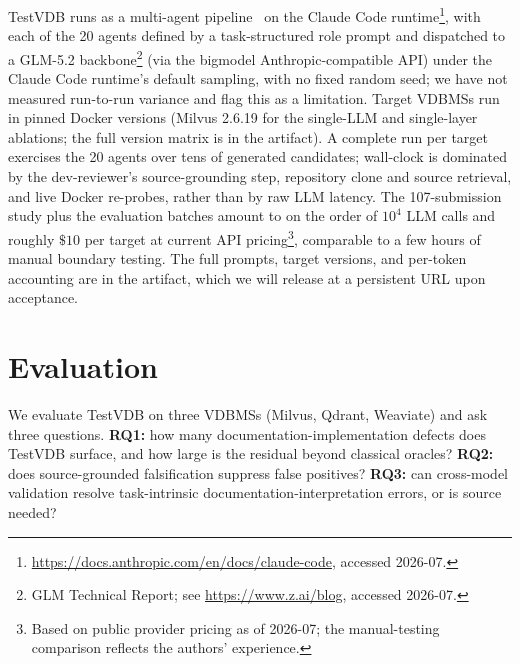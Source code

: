 \documentclass[sigconf]{acmart}
\begin{document}
TestVDB runs as a multi-agent pipeline~\cite{he2025lma} on the Claude Code runtime\footnote{\url{https://docs.anthropic.com/en/docs/claude-code}, accessed 2026-07.}, with each of the 20 agents defined by a task-structured role prompt and dispatched to a GLM-5.2 backbone\footnote{GLM Technical Report; see \url{https://www.z.ai/blog}, accessed 2026-07.} (via the bigmodel Anthropic-compatible API) under the Claude Code runtime's default sampling, with no fixed random seed; we have not measured run-to-run variance and flag this as a limitation. Target VDBMSs run in pinned Docker versions (Milvus 2.6.19 for the single-LLM and single-layer ablations; the full version matrix is in the artifact). A complete run per target exercises the 20 agents over tens of generated candidates; wall-clock is dominated by the dev-reviewer's source-grounding step, repository clone and source retrieval, and live Docker re-probes, rather than by raw LLM latency. The 107-submission study plus the evaluation batches amount to on the order of $10^4$ LLM calls and roughly $\$10$ per target at current API pricing\footnote{Based on public provider pricing as of 2026-07; the manual-testing comparison reflects the authors' experience.}, comparable to a few hours of manual boundary testing. The full prompts, target versions, and per-token accounting are in the artifact, which we will release at a persistent URL upon acceptance.

\section{Evaluation} \label{sec:eval}

We evaluate TestVDB on three VDBMSs (Milvus, Qdrant, Weaviate) and ask three questions. \textbf{RQ1:} how many documentation-implementation defects does TestVDB surface, and how large is the residual beyond classical oracles? \textbf{RQ2:} does source-grounded falsification suppress false positives? \textbf{RQ3:} can cross-model validation resolve task-intrinsic documentation-interpretation errors, or is source needed?
\end{document}
